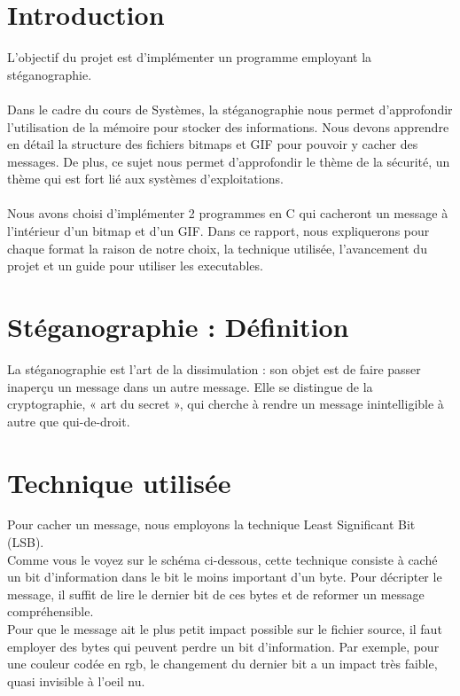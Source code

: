 \section{Introduction}
L'objectif du projet est d'implémenter un programme employant la stéganographie.\\\\
Dans le cadre du cours de Systèmes, la stéganographie nous permet d'approfondir l'utilisation de la mémoire pour stocker des informations. 
Nous devons apprendre en détail la structure des fichiers bitmaps et GIF pour pouvoir y cacher des messages. 
De plus, ce sujet nous permet d'approfondir le thème de la sécurité, un thème qui est fort lié aux systèmes d'exploitations.\\\\

Nous avons choisi d'implémenter 2 programmes en C qui cacheront un message à l'intérieur d'un bitmap et d'un GIF. 
Dans ce rapport, nous expliquerons pour chaque format la raison de notre choix, la technique utilisée, l'avancement du projet et un guide pour utiliser les executables. 


\section{Stéganographie : Définition}
La stéganographie est l'art de la dissimulation : son objet est de faire passer inaperçu un message dans un autre message. 
Elle se distingue de la cryptographie, « art du secret », qui cherche à rendre un message inintelligible à autre que qui-de-droit.\\


\section {Technique utilisée}
Pour cacher un message, nous employons la technique Least Significant Bit (LSB). \\

Comme vous le voyez sur le schéma ci-dessous, cette technique consiste à caché un bit d'information dans le bit le moins important d'un byte. 
Pour décripter le message, il suffit de lire le dernier bit de ces bytes et de reformer un message compréhensible.\\

Pour que le message ait le plus petit impact possible sur le fichier source, il faut employer des bytes qui peuvent perdre un bit d'information. 
Par exemple, pour une couleur codée en rgb, le changement du dernier bit a un impact très faible, quasi invisible à l'oeil nu.\\\\

